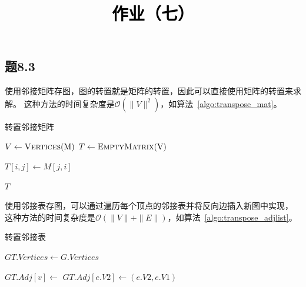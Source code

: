 \documentclass[a4paper,twoside]{article}
\newcommand{\PaperTitle}{作业（七）}  %
\begin{document}
\newpage

\title{
	\Large{\textcolor{black}{\PaperTitle}}
}
	
	
\maketitle
	
\tableofcontents
 
\newpage
\setcounter{page}{1}

\begin{spacing}{1.2}

\section{题8.3}

使用邻接矩阵存图，图的转置就是矩阵的转置，因此可以直接使用矩阵的转置来求解。
这种方法的时间复杂度是$\mathcal{O}(\|V\|^2)$，如算法~\ref{algo:transpose_mat}。

\begin{algorithm}
	\caption{转置邻接矩阵}
	\label{algo:transpose_mat}
	\begin{algorithmic}[1]
		

		\State $V \gets \Call{Vertices}{$M$}$
		\State $T \gets \Call{EmptyMatrix}{$V$}$


				\State $T[i,j] \gets M[j,i]$
			\EndFor
		\EndFor

		\State \Return $T$
		
		\EndProcedure
	\end{algorithmic}
\end{algorithm}	

使用邻接表存图，可以通过遍历每个顶点的邻接表并将反向边插入新图中实现，
这种方法的时间复杂度是$\mathcal{O}(\|V\|+\|E\|)$，如算法~\ref{algo:transpose_adjlist}。

\begin{algorithm}
	\caption{转置邻接表}
	\label{algo:transpose_adjlist}
	\begin{algorithmic}[1]
		
		\State $GT.Vertices\gets G.Vertices$

			\State $GT.Adj[v] \gets$ 
				\State $GT.Adj[e.V2] \gets (e.V2,e.V1)$
			\EndFor
		\EndFor
		\EndProcedure
	\end{algorithmic}
\end{algorithm}	


\end{spacing}
\end{document}
